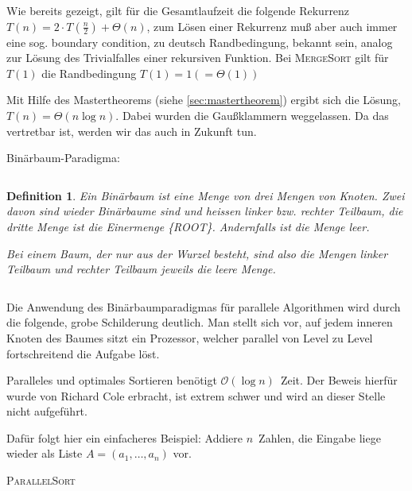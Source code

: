 \documentclass[ngerman,draft,parskip=half*,twoside]{scrreprt}
\theoremstyle{break}
\newtheorem{definition}{Definition}[chapter]
\theoremstyle{nonumberbreak}
\newcommand*{\OO}{\mathcal{O}}      %
\begin{document}
Wie bereits gezeigt, gilt für die Gesamtlaufzeit die folgende Rekurrenz $T(n) = 2\cdot T(\frac{n}{2})+\Theta(n)$, zum Lösen einer
Rekurrenz muß aber auch immer eine sog. boundary condition, zu deutsch Randbedingung, bekannt sein, analog zur Lösung des Trivialfalles einer rekursiven
Funktion. Bei \textsc{MergeSort} gilt für $T(1)$ die Randbedingung $T(1) = 1(=\Theta(1))$

Mit Hilfe des Mastertheorems (siehe \autoref{sec:mastertheorem}) ergibt
sich die Lösung, $T(n) = \Theta(n \log n)$. Dabei wurden die
Gaußklammern  weggelassen. Da das vertretbar ist, werden wir das auch
in Zukunft tun.

\begin{description}
	\item [Binärbaum-Paradigma:] 
\end{description}
	
$  $

\begin{definition}
  Ein Binärbaum ist eine Menge von drei Mengen von Knoten. Zwei davon
  sind wieder Binärbaume sind und heissen linker bzw.  rechter
  Teilbaum, die dritte Menge ist die Einermenge \{ROOT\}. Andernfalls
  ist die Menge leer.
	  
  Bei einem Baum, der nur aus der Wurzel besteht, sind also die Mengen
  linker Teilbaum und rechter Teilbaum jeweils die leere Menge.
\end{definition}

$  $

Die Anwendung des Binärbaumparadigmas für parallele Algorithmen wird durch die folgende, grobe Schilderung deutlich.
Man stellt sich vor, auf jedem inneren Knoten des Baumes sitzt ein Prozessor, welcher parallel von Level zu Level fortschreitend die
Aufgabe löst.

Paralleles und optimales Sortieren benötigt $\OO(\log n)$~Zeit. Der
Beweis hierfür wurde von Richard Cole erbracht, ist extrem schwer und
wird an dieser Stelle nicht aufgeführt.

Dafür folgt hier ein einfacheres Beispiel: Addiere $n$~Zahlen, die
Eingabe liege wieder als Liste $A=(a_1,\ldots,a_n)$ vor.

\begin{algorithm}
\caption{\textsc{ParallelSort}}
\end{algorithm}
\end{document}
